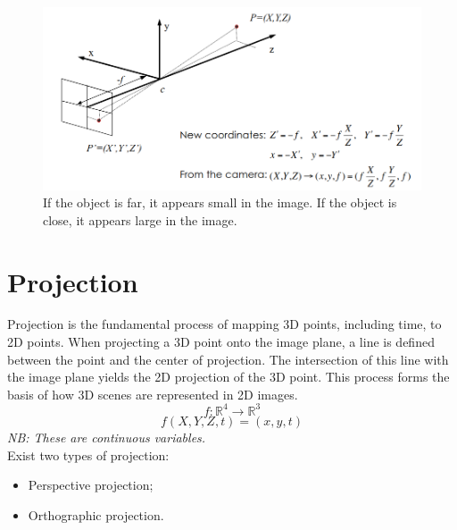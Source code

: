 \begin{figure}[H]
    \centering
    \includegraphics[width=1\textwidth]{Figures/Pinhole.png}
    \caption{If the object is far, it appears small in the image. If the object is close, it appears large in the image.}
\end{figure}
\section{Projection}
Projection is the fundamental process of mapping 3D points, including time, to 2D points. When projecting a 3D point onto the image plane, a line is defined between the point and the center of projection. The intersection of this line with the image plane yields the 2D projection of the 3D point. This process forms the basis of how 3D scenes are represented in 2D images.
\[
    f: \mathbb{R}^4 \rightarrow \mathbb{R}^3    
\]
\[
    f(X,Y,Z,t) = (x,y,t)
\]
\textit{NB: These are continuous variables.}       
\\
Exist two types of projection:
\begin{itemize}
    \item Perspective projection;
    \item Orthographic projection.
\end{itemize}
